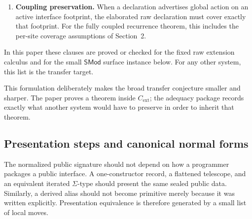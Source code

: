 \documentclass{lmcs}
\begin{document}
\begin{rem}
\begin{enumerate}
\item \textbf{Coupling preservation.}  When a declaration advertises global action on an
active interface footprint, the elaborated raw declaration must cover exactly that footprint.
For the fully coupled recurrence theorem, this includes the per-site coverage assumptions of
Section~2.
\end{enumerate}

In this paper these clauses are proved or checked for the fixed raw extension calculus and
for the small \(\mathsf{SMod}\) surface instance below.  For any other system, this list is the
transfer target.
\end{rem}

This formulation deliberately makes the broad transfer conjecture smaller and sharper.  The
paper proves a theorem inside \(C_{\mathrm{ext}}\); the adequacy package records exactly what
another system would have to preserve in order to inherit that theorem.


\subsection{Presentation steps and canonical normal forms}

The normalized public signature should not depend on how a programmer packages a public
interface.  A one-constructor record, a flattened telescope, and an equivalent iterated
\(\Sigma\)-type should present the same sealed public data.  Similarly, a derived alias should
not become primitive merely because it was written explicitly.  Presentation equivalence is
therefore generated by a small list of local moves.
\end{document}
